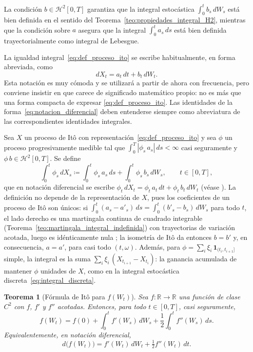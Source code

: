 \documentclass[11pt,a4paper,oneside]{report}
\theoremstyle{plain}
\newtheorem{teorema}{Teorema}[chapter]
\theoremstyle{definition}
\theoremstyle{remark}
\newcommand{\R}{\mathbb{R}}
\newcommand{\1}{\mathbf{1}}
\newcommand{\eqdef}{\coloneqq}
\begin{document}
La condición $b \in \mathcal{H}^2[0, T]$ garantiza que la integral
estocástica $\int_0^t b_s\, dW_s$ está bien definida en el sentido del
Teorema~\ref{teo:propiedades_integral_H2}, mientras que la condición
sobre $a$ asegura que la integral $\int_0^t a_s\, ds$ está bien
definida trayectorialmente como integral de Lebesgue.

La igualdad
integral~\eqref{eq:def_proceso_ito} se escribe habitualmente, en forma
abreviada, como
\begin{equation}\label{eq:notacion_diferencial}
  dX_t = a_t\, dt + b_t\, dW_t.
\end{equation}
Esta notación es muy cómoda y se utilizará a partir de ahora con
frecuencia, pero conviene insistir en que carece de significado
matemático propio: no es más que una forma compacta de expresar \eqref{eq:def_proceso_ito}. Las identidades de la
forma~\eqref{eq:notacion_diferencial} deben entenderse siempre como
abreviatura de las correspondientes identidades integrales.

Sea $X$ un proceso de Itô con representación~\eqref{eq:def_proceso_ito} y sea $\phi$ un proceso progresivamente medible tal que $\int_0^T |\phi_s\, a_s|\, ds < \infty$ casi seguramente y $\phi\, b \in \mathcal{H}^2[0, T]$. Se define
\begin{equation*}
  \int_0^t \phi_s\, dX_s \eqdef \int_0^t \phi_s\, a_s\, ds + \int_0^t \phi_s\, b_s\, dW_s, \qquad t \in [0, T],
\end{equation*}
que en notación diferencial se escribe $\phi_t\, dX_t = \phi_t\, a_t\, dt + \phi_t\, b_t\, dW_t$ (véase \cite[§4.2]{etheridge}). La definición no depende de la representación de $X$, pues los coeficientes de un proceso de Itô son únicos: si $\int_0^t (a_s - a'_s)\, ds = \int_0^t (b'_s - b_s)\, dW_s$ para todo $t$, el lado derecho es una martingala continua de cuadrado integrable (Teorema~\ref{teo:martingala_integral_indefinida}) con trayectorias de variación acotada, luego es idénticamente nula \cite[Lema~4.2.11]{etheridge}; la isometría de Itô da entonces $b = b'$ y, en consecuencia, $a = a'$, para casi todo $(t, \omega)$. Además, para $\phi = \sum_i \xi_i\, \mathbf{1}_{(t_i, t_{i+1}]}$ simple, la integral es la suma $\sum_i \xi_i\, (X_{t_{i+1}} - X_{t_i})$: la ganancia acumulada de mantener $\phi$ unidades de $X$, como en la integral estocástica discreta~\eqref{eq:integral_discreta}.

\begin{teorema}[Fórmula de Itô para $f(W_t)$]
\label{teo:formula_ito_brown}
Sea $f : \R \to \R$ una función de clase $C^2$ con $f$, $f'$ y $f''$
acotadas. Entonces, para todo $t \in [0, T]$, casi seguramente,
\begin{equation}\label{eq:formula_ito_brown}
  f(W_t) = f(0) + \int_0^t f'(W_s)\, dW_s
        + \frac{1}{2} \int_0^t f''(W_s)\, ds.
\end{equation}
Equivalentemente, en notación diferencial,
\begin{equation*}
  d\bigl(f(W_t)\bigr) = f'(W_t)\, dW_t + \tfrac{1}{2} f''(W_t)\, dt.
\end{equation*}
\end{teorema}
\end{document}
